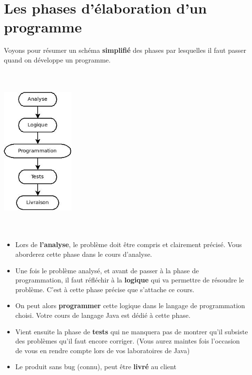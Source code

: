 \section{Les phases d'élaboration d'un programme}

	Voyons pour résumer un schéma \textbf{simplifié} des phases par
	lesquelles il faut passer quand on développe un programme.

	\begin{center}
	\includegraphics[width=3.708cm,height=8.715cm]{image/intro-phases-develop}
	\end{center}

	\begin{itemize}
	\item 
		Lors de \textbf{l'analyse}, le problème doit être
		compris et clairement précisé. Vous aborderez cette phase dans le cours
		d'analyse.
	\item
		Une fois le problème analysé, et avant de passer à la phase de
		programmation, il faut réfléchir à la \textbf{logique} qui va permettre
		de résoudre le problème. C'est à cette phase précise
		que s'attache ce cours.
	\item
		On peut alors \textbf{programmer} cette logique dans le langage de
		programmation choisi. Votre cours de langage Java est dédié à cette
		phase.
	\item
		Vient ensuite la phase de \textbf{tests} qui ne manquera pas de montrer
		qu'il subsiste des problèmes qu'il
		faut encore corriger. (Vous aurez maintes fois
		l'occasion de vous en rendre compte lors de vos
		laboratoires de Java)
	\item
		Le produit sans bug (connu), peut être \textbf{livré} au client
	\end{itemize}

